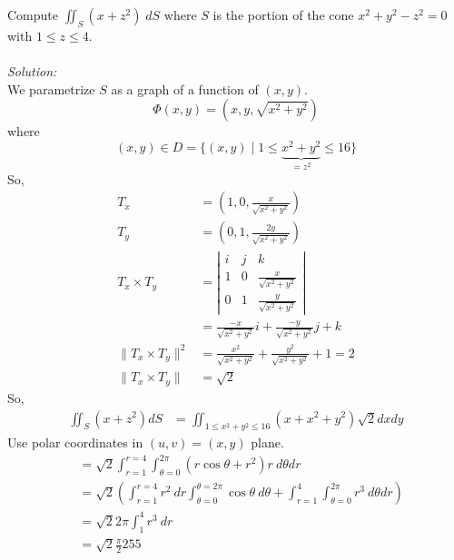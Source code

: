 \documentclass[12pt]{book}
\theoremstyle{definition}
\theoremstyle{remark}
\newcommand\sol{%
  \\ 
  \\
  \textit{Solution:}\\%
}
\begin{document}
\begin{example}Compute $\iint_S (x + z^2) \; dS $ where $S$ is the portion of the cone $x^2 + y^2 -z^2 = 0$ with $1 \leq z \leq 4$. 
  \sol 
  We parametrize $S$ as a graph of a function of $(x,y)$. 
  $$\Phi (x,y) = (x,y, \sqrt{x^2 + y^2}) $$
  where $$(x,y) \in D = \{(x,y)\mid 1 \leq \underbrace{x^2 + y^2}_{= z^2} \leq 16\}$$
  So, 
  \begin{equation*}
    \begin{split}
      T_x &= \left( 1, 0, \frac{x}{\sqrt{x^2 +y^2}}  \right) \\ 
      T_y &= \left( 0, 1, \frac{2y}{\sqrt{x^2 + y^2}}  \right) \\ 
      T_x \times T_y &= \left| \begin{matrix}
        i & j& k \\ 1& 0 & \frac{x}{\sqrt{x^2 + y^2}} \\ 0 & 1 &\frac{y}{\sqrt{x^2 + y^2}} 
      \end{matrix}  \right|\\ 
      &= \frac{-x}{\sqrt{ x^2 + y^2 }} i + \frac{-y}{\sqrt{x^2 + y^2 }} j + k \\ 
      \| T_x \times T_y \|^2 &= \frac{x^2 }{\sqrt{x^2 + y^2}}  +   \frac{y^2 }{\sqrt{x^2 + y^2}} + 1 = 2 \\ 
      \| T_x \times T_y \| &= \sqrt{2}
    \end{split}
  \end{equation*}
  So, 
\begin{equation*}
  \begin{split}
    \iint_S (x + z^2 ) dS &= \iint_{1 \leq x^2 + y^2 \leq 16}( x + x^2 + y^2 )\sqrt 2 dx dy 
  \end{split}
\end{equation*}
  Use polar coordinates in $(u,v) = (x,y)$ plane. 
  \begin{equation*}
    \begin{split}
      &=\sqrt 2 \int_{{r = 1}}^{{r = 4}} \int_{\theta = 0}^{ 2 \pi } (r \cos \theta + r^2 ) r  \: d{\theta} d r \\ 
      &=\sqrt 2 \left( \int_{{r =1}}^{{r=4}} r^2  \: d{r} \int_{{\theta= 0}}^{{\theta = 2\pi }} {\cos \theta} \: d{\theta} + \int_{{r = 1}}^{{4}} \int_{{\theta =0}}^{{2\pi }} {r^3 } \: d{\theta }d r \right) \\ 
      &= \sqrt 2 2 \pi \int_{{1}}^{{4}} {r^3} \: d{r} \\ 
      & = \sqrt 2 \frac{\pi }{2} 255
    \end{split}
  \end{equation*}
\end{example}
\end{document}
